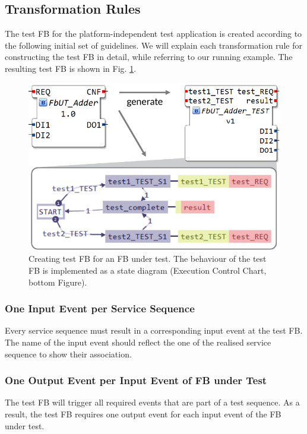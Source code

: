 \begin{bibunit}
\subsection{Transformation Rules}
The test FB for the platform-independent test application is created according to the following initial set of guidelines. 
We will explain each transformation rule for constructing the test FB in detail, while referring to our running example. The resulting test FB is shown in Fig. \ref{fig:testfb}.

\begin{figure}[htbp]
    \centering
    \vspace{-5mm}
    \includegraphics[width=\columnwidth]{MX_Papers/Paper9/Figures/testFB-crop.pdf}
    \caption{Creating test FB for an FB under test. The behaviour of the test FB is implemented as a state diagram (Execution Control Chart, bottom Figure).}
    \label{fig:testfb}
\end{figure}

\subsubsection{One Input Event per Service Sequence}
Every service sequence must result in a corresponding input event at the test FB. The name of the input event should reflect the one of the realised service sequence to show their association. %

\subsubsection{One Output Event per Input Event of FB under Test}
The test FB will trigger all required events that are part of a test sequence. As a result, the test FB requires one output event for each input event of the FB under test. 


\end{bibunit}
